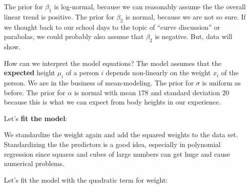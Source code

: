 \documentclass[
]{book}
\newenvironment{Shaded}{\begin{snugshade}}{\end{snugshade}}
\newcommand{\AttributeTok}[1]{\textcolor[rgb]{0.13,0.29,0.53}{#1}}
\newcommand{\CommentTok}[1]{\textcolor[rgb]{0.56,0.35,0.01}{\textit{#1}}}
\newcommand{\DecValTok}[1]{\textcolor[rgb]{0.00,0.00,0.81}{#1}}
\newcommand{\FloatTok}[1]{\textcolor[rgb]{0.00,0.00,0.81}{#1}}
\newcommand{\FunctionTok}[1]{\textcolor[rgb]{0.13,0.29,0.53}{\textbf{#1}}}
\newcommand{\NormalTok}[1]{#1}
\newcommand{\OtherTok}[1]{\textcolor[rgb]{0.56,0.35,0.01}{#1}}
\newcommand{\SpecialCharTok}[1]{\textcolor[rgb]{0.81,0.36,0.00}{\textbf{#1}}}
\begin{document}
The prior for \(\beta_1\) is log-normal, because we can reasonably assume
the the overall linear trend is positive. The prior for \(\beta_2\) is normal, because
we are not so sure. If we thought back to our school days to the topic of
``curve discussion'' or parabolas, we could probably also assume that \(\beta_2\) is negative.
But, data will show.

How can we interpret the model equations?
The model assumes that the \textbf{expected} height \(\mu_i\) of a person \(i\)
depends non-linearly on the weight \(x_i\) of the person.
We are in the business of mean-modeling.
The prior for \(\sigma\) is uniform as before.
The prior for \(\alpha\) is normal with mean \(178\) and standard deviation \(20\)
because this is what we can expect from body heights in our experience.

Let's \textbf{fit the model}:

We standardize the weight again and add the squared weights to the data set.
Standardizing the the predictors is a good idea, especially in polynomial regression
since squares and cubes of large numbers can get huge and cause numerical problems.

Let's fit the model with the quadratic term for weight:

\begin{Shaded}
\end{Shaded}
\end{document}
